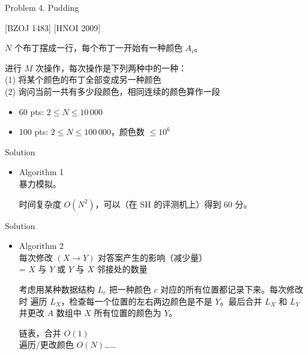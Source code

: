 \documentclass[UTF8]{beamer}
\begin{document}
\begin{frame}{Problem 4. Pudding}

[BZOJ 1483] [HNOI 2009]

$N$ 个布丁摆成一行，每个布丁一开始有一种颜色 $A_i$。

进行 $M$ 次操作，每次操作是下列两种中的一种： \\
(1) 将某个颜色的布丁全部变成另一种颜色 \\
(2) 询问当前一共有多少段颜色，相同连续的颜色算作一段

\begin{itemize}
    \item 60 pts: $2 \leq N \leq 10\,000$
    \item 100 pts: $2 \leq N \leq 100\,000$，颜色数 $\leq 10^6$
\end{itemize}

\end{frame}

\begin{frame}{Solution}

\begin{itemize}
    \item Algorithm 1 \\
        暴力模拟。

        时间复杂度 $O(N^2)$，可以（在 SH 的评测机上）得到 60 分。
\end{itemize}

\end{frame}

\begin{frame}{Solution}

\begin{itemize}
    \item Algorithm 2 \\
        每次修改 $(X \rightarrow Y)$ 对答案产生的影响（减少量） \\
        = $X$ 与 $Y$ 或 $Y$ 与 $X$ 邻接处的数量

        \pause
        考虑用某种数据结构 $L_c$ 把一种颜色 $c$ 对应的所有位置都记录下来。每次修改时
        遍历 $L_X$，检查每一个位置的左右两边颜色是不是 $Y$。最后合并 $L_X$ 和 $L_Y$
        并更改 $A$ 数组中 $X$ 所有位置的颜色为 $Y$。

        \pause 链表，合并 $O(1)$ \\
        \pause 遍历/更改颜色 $O(N)$……
        
\end{itemize}

\end{frame}
\end{document}
